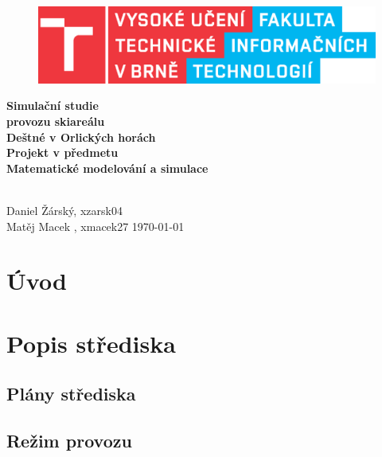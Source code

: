 \documentclass[a4paper, 11pt]{article}\usepackage{times}
\begin{document}
\begin{titlepage}
    \begin{center}
    \begin{figure}[!h]
            \centering
            \includegraphics[scale=0.7]{logo.eps}
        \end{figure}        
    
        \vspace{100px}
    
        \huge{
            \textbf{
                Simulační studie\\ provozu skiareálu \\
                Deštné v Orlických horách\\
            }
        }
        \vspace{40px}
        \large
        \textbf{
            Projekt v předmetu\\
            Matematické modelování a simulace\\
        }
        \vfill
    \end{center}
        \Large{
            \hfill\\
            Daniel Žárský, xzarsk04\\
            Matěj Macek , xmacek27 \hfill \today
        }

\end{titlepage}


\clearpage
\thispagestyle{empty}
	\tableofcontents
\newpage
{}
\setcounter{page}{1}
\section{Úvod} %
\section{Popis střediska}
\subsection{Plány střediska}
\subsection{Režim provozu}
\end{document}
